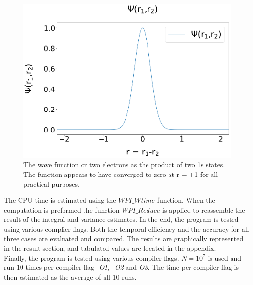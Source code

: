 \documentclass[%
reprint,
amsmath,amssymb,
aps,
]{revtex4-1}
\begin{document}
\begin{figure}[!hb]
	\includegraphics[scale = 0.24]{Wavefunction.png}
	\caption{\label{wavefigure} The wave function or two electrons as the product of two 1s states. The function appears to have converged to zero at r = $\pm$1 for all practical purposes.}
\end{figure}
 The CPU time is estimated using the $WPI\_Wtime$ function. When the computation is preformed the function $WPI\_Reduce$ is applied to reassemble the result of the integral and variance estimates. In the end, the program is tested using various complier flags. Both the temporal efficiency and the accuracy for all three cases are evaluated and compared. The results are graphically represented in the result section, and tabulated values are located in the appendix. \\ \indent 
 Finally, the program is tested using various compiler flags. $N=10^7$ is used and run 10 times per compiler flag \textit{-O1, -O2} and \textit{O3}. The time per compiler flag is then estimated as the average of all 10 runs. 
 
\end{document}
